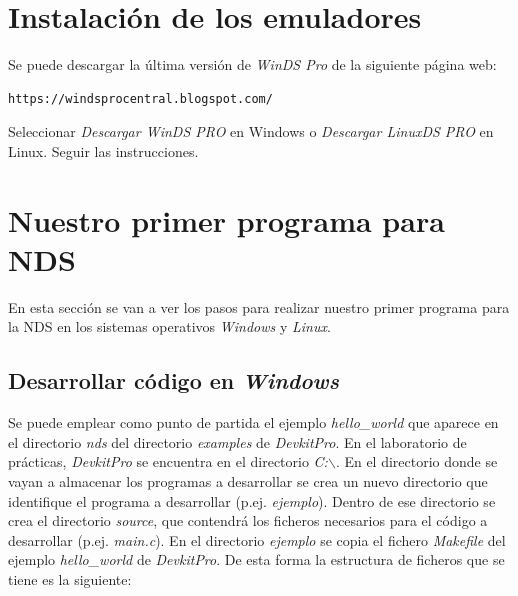 	
\section{Instalación de los emuladores}
Se puede descargar la última versión de \textit{WinDS Pro} de la siguiente página web:
\begin{verbatim}
https://windsprocentral.blogspot.com/\end{verbatim} 

Seleccionar \textit{Descargar WinDS PRO} en Windows o \textit{Descargar LinuxDS PRO} en Linux. Seguir las instrucciones.

\section{Nuestro primer programa para NDS}
En esta sección se van a ver los pasos para realizar nuestro primer programa para la NDS en los sistemas operativos \textit{Windows} y \textit{Linux}. 

\subsection{Desarrollar código en \textit{Windows}}
\label{sec:programa}

Se puede emplear como punto de partida el ejemplo  \textit{hello\_world} que aparece en el directorio \textit{nds} del directorio \textit{examples} de  \textit{DevkitPro}. En  el laboratorio de prácticas, \textit{DevkitPro} se encuentra en el directorio \textit{C:$\backslash$}. En el directorio donde se vayan a almacenar los  programas a desarro\-llar se crea un nuevo directorio que identifique el programa a desarrollar (p.ej. \textit{ejemplo}). Dentro de ese directorio se crea el directorio \textit{source}, que contendrá los ficheros necesarios para el código a desarrollar (p.ej. \textit{main.c}). En el directorio \textit{ejemplo} se copia el fichero \textit{Makefile} del  ejemplo  \textit{hello\_world} de \textit{DevkitPro}. De esta forma la estructura de ficheros que se tiene es la siguiente:

